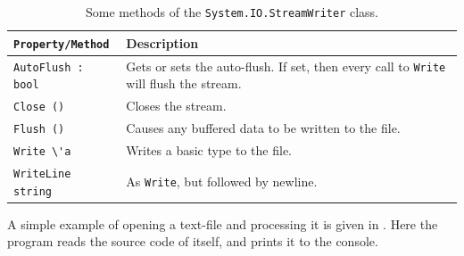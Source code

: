 \documentclass[fsharpNotes.tex]{subfiles}
\begin{document}
%
%
%
%
%
\begin{table}
  \centering
  \begin{tabularx}{\linewidth}{|l|X|}
    \hline
    \rowcolor{headerRowColor}\lstinline{Property/Method} & Description\\
    \hline
    \lstinline{AutoFlush : bool} & Gets or sets the auto-flush. If set, then every call to \lstinline!Write! will flush the stream.\\
    \hline
    \lstinline{Close ()} & Closes the stream.\\
    \hline
    \lstinline{Flush ()} & Causes any buffered data to be written to the file.\\
    \hline
    \lstinline{Write \'a} & Writes a basic type to the file.\\
    \hline
    \lstinline{WriteLine string} & As \lstinline!Write!, but followed by newline.\\
    \hline
  \end{tabularx}
  \caption{Some methods of the \lstinline!System.IO.StreamWriter! class.}
  \label{tab:streamWriterMethods}
\end{table}
A simple example of opening a text-file and processing it is given in .
Here the program reads the source code of itself, and prints it to the console.
\end{document}
